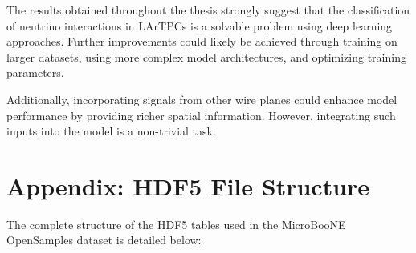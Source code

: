 \documentclass{pracalicmgr}
\begin{document}
The results obtained throughout the thesis strongly suggest that the classification of neutrino interactions in LArTPCs is a solvable problem using deep learning approaches. Further improvements could likely be achieved through training on larger datasets, using more complex model architectures, and optimizing training parameters.

Additionally, incorporating signals from other wire planes could enhance model performance by providing richer spatial information. However, integrating such inputs into the model is a non-trivial task.

\newpage

\listoffigures
\newpage

\listoftables
\newpage



\newpage

\appendix

\section*{Appendix: HDF5 File Structure}
\label{app:hdf5_structure}

The complete structure of the HDF5 tables used in the MicroBooNE OpenSamples dataset is detailed below:
\end{document}
